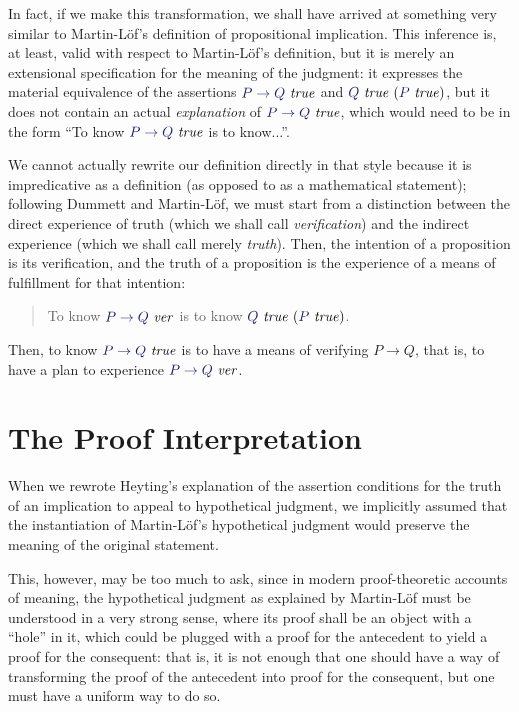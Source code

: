 \documentclass[11pt]{amsart}
\theoremstyle{definition}
\theoremstyle{remark}
\numberwithin{equation}{section}
\def\InputModeColorName{MidnightBlue}
\newcommand\InputMode[1]{{\color{\InputModeColorName}{#1}}}
\newcommand\HypJ[2]{#1\ (#2)}
\newcommand\IsVer[1]{\InputMode{#1}\ \mathit{ver}}
\newcommand\IsTrue[1]{\InputMode{#1}\ \mathit{true}}
\begin{document}
In fact, if we make this transformation, we shall have arrived at something very
similar to Martin-L\"of's definition of propositional implication. This
inference is, at least, valid with respect to Martin-L\"of's definition, but it
is merely an extensional specification for the meaning of the judgment: it
expresses the material equivalence of the assertions $\IsTrue{P\to Q}$ and
$\HypJ{\IsTrue{Q}}{\IsTrue{P}}$, but it does not contain an actual
\emph{explanation} of $\IsTrue{P\to Q}$, which would need to be in the form ``To
know $\IsTrue{P\to Q}$ is to know...''.

We cannot actually rewrite our definition directly in that style because it is
impredicative as a definition (as opposed to as a mathematical statement);
following Dummett \cite{Dummett:Elements} and Martin-L\"of, we must start from a
distinction between the direct experience of truth (which we shall call
\emph{verification}) and the indirect experience (which we shall call merely
\emph{truth}). Then, the intention of a proposition is its verification, and the
truth of a proposition is the experience of a means of fulfillment for that
intention:

\begin{quote}
  To know $\IsVer{P\to Q}$ is to know $\HypJ{\IsTrue{Q}}{\IsTrue{P}}$.
\end{quote}

Then, to know $\IsTrue{P\to Q}$ is to have a means of verifying $P\to Q$, that
is, to have a plan to experience $\IsVer{P\to Q}$.

\section{The Proof Interpretation}

When we rewrote Heyting's explanation of the assertion conditions for the truth
of an implication to appeal to hypothetical judgment, we implicitly assumed that
the instantiation of Martin-L\"of's hypothetical judgment would preserve the
meaning of the original statement.

This, however, may be too much to ask, since in modern proof-theoretic accounts
of meaning, the hypothetical judgment as explained by Martin-L\"of must be
understood in a very strong sense, where its proof shall be an object with a
``hole'' in it, which could be plugged with a proof for the antecedent to yield
a proof for the consequent: that is, it is not enough that one should have a way
of transforming the proof of the antecedent into proof for the consequent, but
one must have a uniform way to do so.
\end{document}
